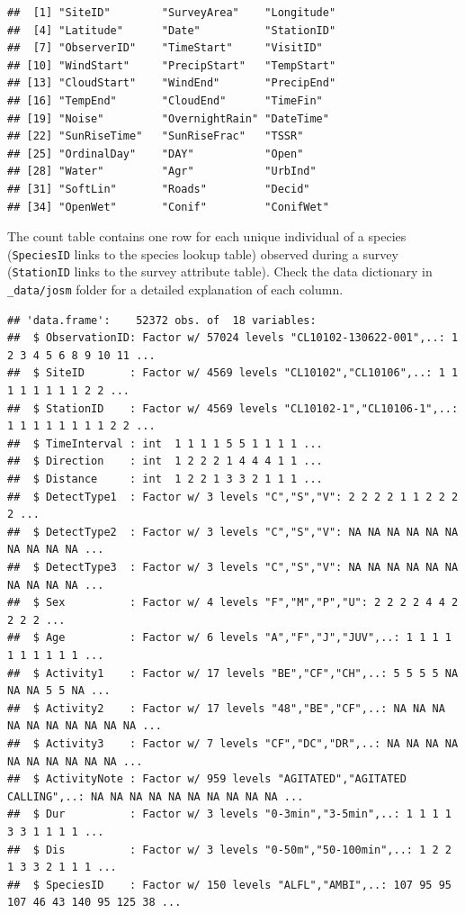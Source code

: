 \documentclass[12pt,]{scrbook}
\newenvironment{Shaded}{\begin{snugshade}}{\end{snugshade}}
\newcommand{\KeywordTok}[1]{\textcolor[rgb]{0.13,0.29,0.53}{\textbf{#1}}}
\newcommand{\NormalTok}[1]{#1}
\newcommand{\OperatorTok}[1]{\textcolor[rgb]{0.81,0.36,0.00}{\textbf{#1}}}
\begin{document}
\begin{verbatim}
##  [1] "SiteID"        "SurveyArea"    "Longitude"    
##  [4] "Latitude"      "Date"          "StationID"    
##  [7] "ObserverID"    "TimeStart"     "VisitID"      
## [10] "WindStart"     "PrecipStart"   "TempStart"    
## [13] "CloudStart"    "WindEnd"       "PrecipEnd"    
## [16] "TempEnd"       "CloudEnd"      "TimeFin"      
## [19] "Noise"         "OvernightRain" "DateTime"     
## [22] "SunRiseTime"   "SunRiseFrac"   "TSSR"         
## [25] "OrdinalDay"    "DAY"           "Open"         
## [28] "Water"         "Agr"           "UrbInd"       
## [31] "SoftLin"       "Roads"         "Decid"        
## [34] "OpenWet"       "Conif"         "ConifWet"
\end{verbatim}

The count table contains one row for each unique individual
of a species (\texttt{SpeciesID} links to the species lookup table)
observed during a survey (\texttt{StationID} links to the survey attribute table).
Check the data dictionary in \texttt{\_data/josm} folder for a detailed explanation of each column.

\begin{Shaded}
\end{Shaded}

\begin{verbatim}
## 'data.frame':    52372 obs. of  18 variables:
##  $ ObservationID: Factor w/ 57024 levels "CL10102-130622-001",..: 1 2 3 4 5 6 8 9 10 11 ...
##  $ SiteID       : Factor w/ 4569 levels "CL10102","CL10106",..: 1 1 1 1 1 1 1 1 2 2 ...
##  $ StationID    : Factor w/ 4569 levels "CL10102-1","CL10106-1",..: 1 1 1 1 1 1 1 1 2 2 ...
##  $ TimeInterval : int  1 1 1 1 5 5 1 1 1 1 ...
##  $ Direction    : int  1 2 2 2 1 4 4 4 1 1 ...
##  $ Distance     : int  1 2 2 1 3 3 2 1 1 1 ...
##  $ DetectType1  : Factor w/ 3 levels "C","S","V": 2 2 2 2 1 1 2 2 2 2 ...
##  $ DetectType2  : Factor w/ 3 levels "C","S","V": NA NA NA NA NA NA NA NA NA NA ...
##  $ DetectType3  : Factor w/ 3 levels "C","S","V": NA NA NA NA NA NA NA NA NA NA ...
##  $ Sex          : Factor w/ 4 levels "F","M","P","U": 2 2 2 2 4 4 2 2 2 2 ...
##  $ Age          : Factor w/ 6 levels "A","F","J","JUV",..: 1 1 1 1 1 1 1 1 1 1 ...
##  $ Activity1    : Factor w/ 17 levels "BE","CF","CH",..: 5 5 5 5 NA NA NA 5 5 NA ...
##  $ Activity2    : Factor w/ 17 levels "48","BE","CF",..: NA NA NA NA NA NA NA NA NA NA ...
##  $ Activity3    : Factor w/ 7 levels "CF","DC","DR",..: NA NA NA NA NA NA NA NA NA NA ...
##  $ ActivityNote : Factor w/ 959 levels "AGITATED","AGITATED CALLING",..: NA NA NA NA NA NA NA NA NA NA ...
##  $ Dur          : Factor w/ 3 levels "0-3min","3-5min",..: 1 1 1 1 3 3 1 1 1 1 ...
##  $ Dis          : Factor w/ 3 levels "0-50m","50-100min",..: 1 2 2 1 3 3 2 1 1 1 ...
##  $ SpeciesID    : Factor w/ 150 levels "ALFL","AMBI",..: 107 95 95 107 46 43 140 95 125 38 ...
\end{verbatim}
\end{document}
